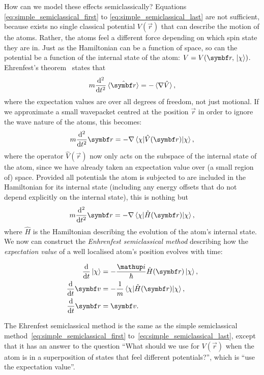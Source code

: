 How can we model these effects semiclassically? Equations \eqref{eq:simple_semiclassical_first} to \eqref{eq:simple_semiclassical_last} are not sufficient, because exists no single classical potential $V(\vec r)$ that can describe the motion of the atoms. Rather, the atoms feel a different force depending on which spin state they are in. Just as the Hamiltonian can be a function of space, so can the potential be a function of the internal state of the atom: $V = V(\vec{r}, \ket\chi)$. Ehrenfest's theorem~\cite{Ehrenfest1927} states that
\begin{align}
m\dv[2]{t}\ev{\hat{\vec r}} = - \ev{\nabla \hat V},
\end{align}
where the expectation values are over all degrees of freedom, not just motional. If we approximate a small wavepacket centred at the position $\vec r$ in order to ignore the wave nature of the atoms, this becomes:
\begin{align}
m\dv[2]{t} \vec r = - \nabla \matrixel{\chi}{\hat V(\vec r)}{\chi},
\end{align}
where the operator $\hat V(\vec r)$ now only acts on the subspace of the internal state of the atom, since we have already taken an expectation value over (a small region of) space. Provided all potentials the atom is subjected to are included in the Hamiltonian for its internal state (including any energy offsets that do not
depend explicitly on the internal state), this is nothing but
\begin{align}
m\dv[2]{t} \vec r = - \nabla \matrixel{\chi}{\hat H(\vec r)}{\chi},
\end{align}
where $\hat H$ is the Hamiltonian describing the evolution of the atom's internal state. We now can construct the \emph{Enhrenfest semiclassical method} describing how the \emph{expectation value} of a well localised atom's position evolves with time:

\begin{align}\label{eq:ehrenfest_semiclassical_first}
\dv{t}\ket\chi &= -\frac\ii\hbar \hat H(\vec r)\ket\chi,\\
\dv{t}\vec v &= -\frac1m\matrixel{\chi}{\hat H(\vec r)}{\chi},\\
\dv{t}\vec r &= \vec v\label{eq:ehrenfest_semiclassical_last}.
\end{align}

The Ehrenfest semiclassical method is the same as the simple semiclassical method~\eqref{eq:simple_semiclassical_first} to~\eqref{eq:simple_semiclassical_last}, except that it has an answer to the question ``What should we use for $V(\vec r)$ when the atom is in a superposition of states that feel different potentials?'', which is ``use the expectation value''. 

